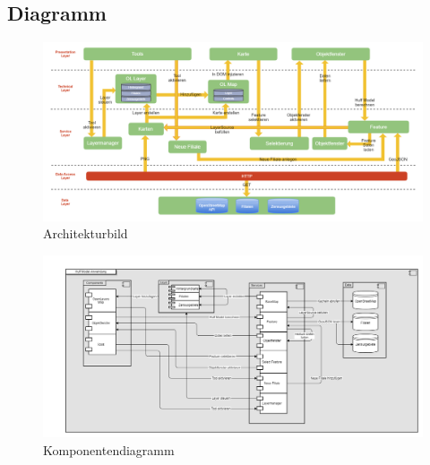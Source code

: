 \appendix

\chapter{}

\section{Diagramm}

\begin{figure}[ht]
	\centering
	\includegraphics[angle=270, scale=0.35]{resources/images/architecture.png}
		\caption{Architekturbild}
\end{figure}

\begin{figure}[ht]
	\centering
	\includegraphics[angle=270, scale=0.45]{resources/images/Komponentendiagramm.png}
		\caption{Komponentendiagramm}
\end{figure}
